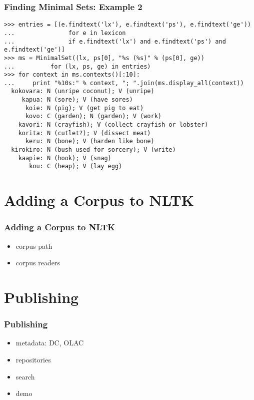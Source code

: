 \documentclass{beamer}             %
\begin{document}
\begin{frame}[fragile]
\frametitle{Finding Minimal Sets: Example 2}
\scriptsize

\begin{verbatim}
>>> entries = [(e.findtext('lx'), e.findtext('ps'), e.findtext('ge'))
...               for e in lexicon
...               if e.findtext('lx') and e.findtext('ps') and e.findtext('ge')]
>>> ms = MinimalSet((lx, ps[0], "%s (%s)" % (ps[0], ge))
...          for (lx, ps, ge) in entries)
>>> for context in ms.contexts()[:10]:
...     print "%10s:" % context, "; ".join(ms.display_all(context))
  kokovara: N (unripe coconut); V (unripe)
     kapua: N (sore); V (have sores)
      koie: N (pig); V (get pig to eat)
      kovo: C (garden); N (garden); V (work)
    kavori: N (crayfish); V (collect crayfish or lobster)
    korita: N (cutlet?); V (dissect meat)
      keru: N (bone); V (harden like bone)
  kirokiro: N (bush used for sorcery); V (write)
    kaapie: N (hook); V (snag)
       kou: C (heap); V (lay egg)
\end{verbatim}
\end{frame}


\section{Adding a Corpus to NLTK}

\begin{frame}
\frametitle{Adding a Corpus to NLTK}

\begin{itemize}
\item corpus path
\item corpus readers
\end{itemize}
\end{frame}


\section{Publishing}

\begin{frame}
\frametitle{Publishing}

\begin{itemize}
\item metadata: DC, OLAC
\item repositories
\item search
\item demo
\end{itemize}

\end{frame}
\end{document}
